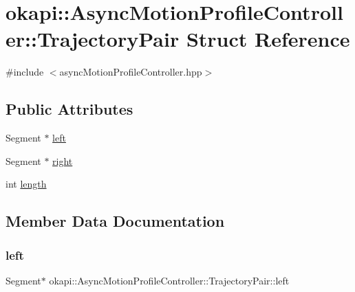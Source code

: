 \hypertarget{structokapi_1_1AsyncMotionProfileController_1_1TrajectoryPair}{}\section{okapi\+::Async\+Motion\+Profile\+Controller\+::Trajectory\+Pair Struct Reference}
\label{structokapi_1_1AsyncMotionProfileController_1_1TrajectoryPair}


{\ttfamily \#include $<$async\+Motion\+Profile\+Controller.\+hpp$>$}

\subsection*{Public Attributes}
\begin{DoxyCompactItemize}
\item 
Segment $\ast$ \mbox{\hyperlink{structokapi_1_1AsyncMotionProfileController_1_1TrajectoryPair_abd4e509e21e592550e8de930757f5b16}{left}}
\item 
Segment $\ast$ \mbox{\hyperlink{structokapi_1_1AsyncMotionProfileController_1_1TrajectoryPair_afed9f551e21365233c83fb7eb14f50d2}{right}}
\item 
int \mbox{\hyperlink{structokapi_1_1AsyncMotionProfileController_1_1TrajectoryPair_a438b73c80a94e07dd9abca0df6d4aa7f}{length}}
\end{DoxyCompactItemize}


\subsection{Member Data Documentation}
\mbox{\label{structokapi_1_1AsyncMotionProfileController_1_1TrajectoryPair_abd4e509e21e592550e8de930757f5b16}} 
\subsubsection{\texorpdfstring{left}{left}}
{\footnotesize\ttfamily Segment$\ast$ okapi\+::\+Async\+Motion\+Profile\+Controller\+::\+Trajectory\+Pair\+::left}


